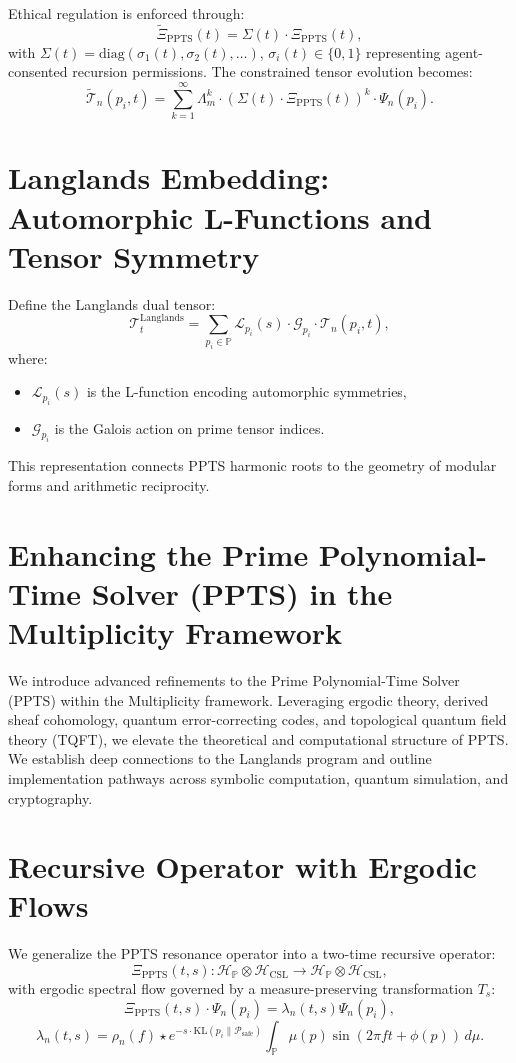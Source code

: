 \documentclass[11pt]{article}
\begin{document}
Ethical regulation is enforced through:
\[
\widetilde{\Xi}_{\text{PPTS}}(t) = \Sigma(t) \cdot \Xi_{\text{PPTS}}(t),
\]
with \(\Sigma(t) = \text{diag}(\sigma_1(t), \sigma_2(t), \dots)\), \(\sigma_i(t) \in \{0,1\}\) representing agent-consented recursion permissions. The constrained tensor evolution becomes:
\[
\widetilde{\mathcal{T}}_n(p_i, t) = \sum_{k=1}^{\infty} \Lambda_m^k \cdot \left(\Sigma(t) \cdot \Xi_{\text{PPTS}}(t)\right)^k \cdot \Psi_n(p_i).
\]

\section{Langlands Embedding: Automorphic L-Functions and Tensor Symmetry}

Define the Langlands dual tensor:
\[
\mathcal{T}_t^{\text{Langlands}} = \sum_{p_i \in \mathbb{P}} \mathcal{L}_{p_i}(s) \cdot \mathcal{G}_{p_i} \cdot \mathcal{T}_n(p_i, t),
\]
where:
\begin{itemize}[noitemsep]
  \item \(\mathcal{L}_{p_i}(s)\) is the L-function encoding automorphic symmetries,
  \item \(\mathcal{G}_{p_i}\) is the Galois action on prime tensor indices.
\end{itemize}
This representation connects PPTS harmonic roots to the geometry of modular forms and arithmetic reciprocity.

\section{Enhancing the Prime Polynomial-Time Solver (PPTS) in the Multiplicity Framework}

We introduce advanced refinements to the Prime Polynomial-Time Solver (PPTS) within the Multiplicity framework. Leveraging ergodic theory, derived sheaf cohomology, quantum error-correcting codes, and topological quantum field theory (TQFT), we elevate the theoretical and computational structure of PPTS. We establish deep connections to the Langlands program and outline implementation pathways across symbolic computation, quantum simulation, and cryptography.

\section{Recursive Operator with Ergodic Flows}
We generalize the PPTS resonance operator into a two-time recursive operator:
\begin{equation}
\Xi_{\text{PPTS}}(t, s): \mathcal{H}_\mathbb{P} \otimes \mathcal{H}_{\text{CSL}} \to \mathcal{H}_\mathbb{P} \otimes \mathcal{H}_{\text{CSL}},
\end{equation}
with ergodic spectral flow governed by a measure-preserving transformation $T_s$:
\begin{equation}
\Xi_{\text{PPTS}}(t, s) \cdot \Psi_n(p_i) = \lambda_n(t, s) \Psi_n(p_i),
\end{equation}
\begin{equation}
\lambda_n(t, s) = \rho_n(f) \star e^{-s \cdot \text{KL}(p_i \| \mathcal{P}_{\text{safe}})} \int_\mathbb{P} \mu(p) \sin(2\pi f t + \phi(p)) \, d\mu.
\end{equation}
\end{document}
